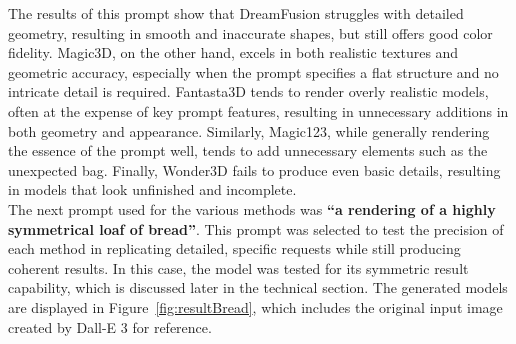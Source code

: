 The results of this prompt show that DreamFusion struggles with detailed geometry, resulting in smooth and inaccurate shapes, but still offers good color fidelity. Magic3D, on the other hand, excels in both realistic textures and geometric accuracy, especially when the prompt specifies a flat structure and no intricate detail is required. Fantasta3D tends to render overly realistic models, often at the expense of key prompt features, resulting in unnecessary additions in both geometry and appearance. Similarly, Magic123, while generally rendering the essence of the prompt well, tends to add unnecessary elements such as the unexpected bag. Finally, Wonder3D fails to produce even basic details, resulting in models that look unfinished and incomplete.\\




The next prompt used for the various methods was \textbf{``a rendering of a highly symmetrical loaf of bread''}. This prompt was selected to test the precision of each method in replicating detailed, specific requests while still producing coherent results. In this case, the model was tested for its symmetric result capability, which is discussed later in the technical section. The generated models are displayed in Figure~\ref{fig:resultBread}, which includes the original input image created by Dall-E 3 for reference.

